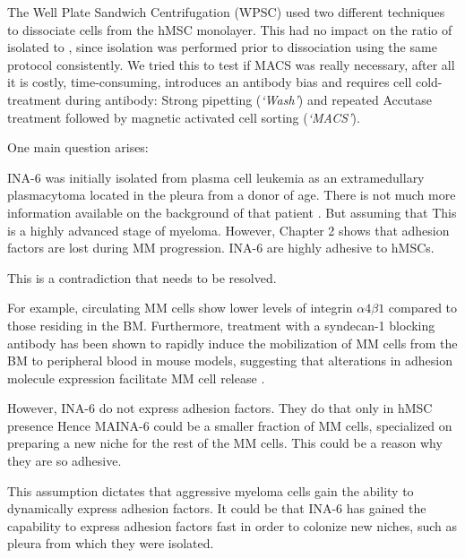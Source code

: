 The Well Plate
Sandwich Centrifugation (WPSC) used two different techniques to dissociate
\MAina cells from the hMSC monolayer. This had no impact on the ratio of
isolated \MAina to \nMAina, since \nMAina isolation was performed prior to
dissociation using the same protocol consistently. We tried this to test if MACS
was really necessary, after all it is costly, time-consuming, introduces an antibody bias
and requires cell cold-treatment during antibody: Strong pipetting
(\emph{`Wash'}) and repeated Accutase treatment followed by magnetic activated
cell sorting (\emph{`MACS'}).

%
\label{sec:discussion_dynamic_regulation}%

One main question arises:

INA-6 was initially isolated from plasma cell leukemia as an extramedullary
plasmacytoma located in the pleura from a donor of age.
There is not much more information available on the background of that patient \cite{TwoNewInterleukin6,burgerGp130RasMediated2001}.
But assuming that
This is a highly advanced
stage of myeloma. However,  Chapter 2 shows that adhesion factors are
lost during MM progression. INA-6 are highly adhesive to hMSCs.



This is a contradiction that needs to be resolved.

For example,
circulating MM cells show lower levels of integrin $\alpha4\beta1$
compared to those residing in the BM. Furthermore, treatment with a syndecan-1 blocking antibody
has been shown to rapidly induce the mobilization of MM cells from the BM to
peripheral blood in mouse models, suggesting that alterations in adhesion
molecule expression facilitate MM cell release
\cite{zeissigTumourDisseminationMultiple2020}.

However, INA-6 do not express adhesion factors. They do that only in hMSC presence
Hence MAINA-6 could be a smaller fraction of MM cells, specialized on preparing a new niche
for the rest of the MM cells. This could be a reason why they are so adhesive.

This assumption dictates that aggressive myeloma cells gain the ability
to dynamically express adhesion factors.
It could be that INA-6 has gained the capability to express adhesion factors
fast in order to colonize new niches, such as pleura from which they were
isolated.

